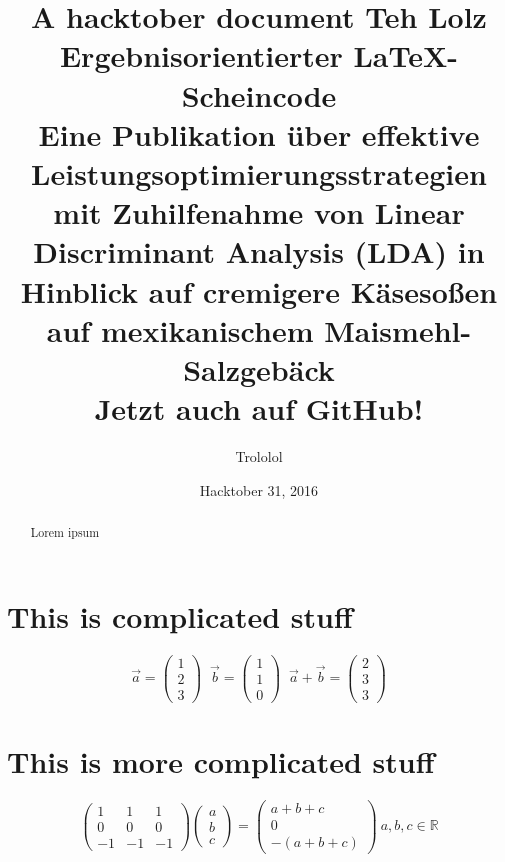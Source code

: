 \documentclass{article}
\title{A hacktober document}
\author{Trololol}
\date{Hacktober 31, 2016}
\title{
    Teh Lolz\\
  \vspace{7mm}
    Ergebnisorientierter {\LaTeX}-Scheincode\\
  \vspace{5mm}
  \small {
    	Eine Publikation \"uber effektive Leistungsoptimierungsstrategien mit Zuhilfenahme von Linear Discriminant Analysis (LDA) in Hinblick auf cremigere K\"aseso\ss{}en auf mexikanischem Maismehl-Salzgeb\"ack\\
    }
  \vspace{1cm}
  \large {
        Jetzt auch auf GitHub!\\
      \vspace{1cm}
    }
}
\begin{document}
	\maketitle	

	\thispagestyle{empty}
	\begin{abstract}
		Lorem ipsum
	\end{abstract}
	
	\newpage
	
	\section{This is complicated stuff}
	\begin{equation*}
		\vec{a} =
		\begin{pmatrix}
		1 \\
		2 \\
		3
		\end{pmatrix}\;\;
		\vec{b} =
		\begin{pmatrix}
		1 \\
		1 \\
		0
		\end{pmatrix}\;\;
		\vec{a} + \vec{b} = \begin{pmatrix}
		2 \\
		3 \\
		3
		\end{pmatrix}
	\end{equation*}
	
	\newpage
	
	\section{This is more complicated stuff}
	\begin{equation}
		\begin{pmatrix}
		1 & 1 & 1 \\
		0 & 0 & 0 \\
		-1 & -1 & -1
		\end{pmatrix}
		\begin{pmatrix}
		a \\
		b \\
		c
		\end{pmatrix} =
		\begin{pmatrix}
		a + b + c \\
		0 \\
		-(a + b + c)
		\end{pmatrix} \>
		a, b, c \in \mathbb{R}
	\end{equation}
	
\end{document}

